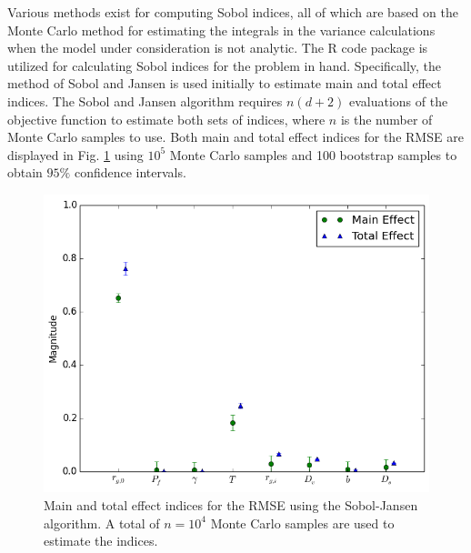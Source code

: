 Various methods exist for computing Sobol indices, all of which are based on the Monte Carlo method for estimating the integrals in the variance calculations when the model under consideration is not analytic. The R code package \cite{R} is utilized for calculating Sobol indices for the problem in hand. Specifically, the method of Sobol and Jansen \cite{Saltelli} is used initially to estimate main and total effect indices. The Sobol and Jansen algorithm requires $n(d+2)$ evaluations of the objective function to estimate both sets of indices, where $n$ is the number of Monte Carlo samples to use. Both main and total effect indices for the \ac{RMSE} are displayed in Fig. \ref{fig:rmse_sobol_indices} using $10^5$ Monte Carlo samples and 100 bootstrap samples to obtain $95\%$ confidence intervals. 
\begin{figure}[!h]
\caption{\label{fig:rmse_sobol_indices}
Main and total effect indices for the \ac{RMSE} using the Sobol-Jansen algorithm. A total of $n=10^4$ Monte Carlo samples are used to estimate the indices.}
 \begin{center}
  \includegraphics[scale=.75]{./Chapter4/sobol_indices.png}
 \end{center}
\end{figure}
